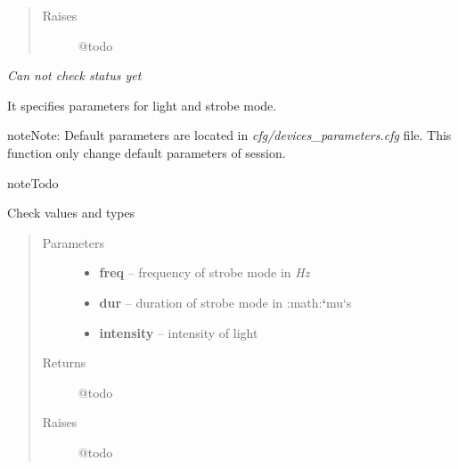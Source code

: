 \documentclass[letterpaper,10pt,english]{sphinxmanual}
\begin{document}
\begin{fulllineitems}
\begin{fulllineitems}
\begin{quote}
\begin{description}
\item[{Raises}] \leavevmode
@todo

\end{description}\end{quote}

\end{fulllineitems}


\begin{fulllineitems}
\label{enuActor.Devices:enuActor.Devices.bia.Bia.op_check_status}
\emph{Can not check status yet}

\end{fulllineitems}


\begin{fulllineitems}
\label{enuActor.Devices:enuActor.Devices.bia.Bia.setConfig}
It specifies parameters for light and strobe mode.

\begin{notice}{note}{Note:}
Default parameters are located in                \emph{cfg/devices\_parameters.cfg} file. This function only                change default parameters of session.
\end{notice}

\begin{notice}{note}{Todo}

Check values and types
\end{notice}
\begin{quote}\begin{description}
\item[{Parameters}] \leavevmode\begin{itemize}
\item {} 
\textbf{freq} -- frequency of strobe mode in \emph{Hz}

\item {} 
\textbf{dur} -- duration of strobe mode in :math:{\color{red}\bfseries{}{}`}mu{}`s

\item {} 
\textbf{intensity} -- intensity of light

\end{itemize}

\item[{Returns}] \leavevmode
@todo

\item[{Raises}] \leavevmode
@todo

\end{description}\end{quote}

\end{fulllineitems}


\end{fulllineitems}
\end{document}
